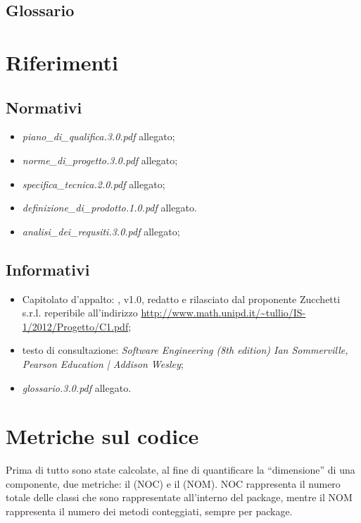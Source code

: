 \subsection{Glossario}
\glossaryIntro
\clearpage

\section{Riferimenti}
\subsection{Normativi}
\begin{itemize}
\item[] \textit{piano\_di\_qualifica.3.0.pdf} allegato;
\item[] \textit{norme\_di\_progetto.3.0.pdf} allegato;
\item[] \textit{specifica\_tecnica.2.0.pdf} allegato;
\item[] \textit{definizione\_di\_prodotto.1.0.pdf} allegato.
\item[] \textit{analisi\_dei\_requsiti.3.0.pdf} allegato;
\end{itemize}

\subsection{Informativi}
\begin{itemize}
\item[] Capitolato d'appalto: \caName{}, v1.0, redatto e rilasciato dal proponente Zucchetti s.r.l. reperibile all'indirizzo \url{http://www.math.unipd.it/~tullio/IS-1/2012/Progetto/C1.pdf};
\item[] testo di consultazione: \textit{Software Engineering (8th edition) Ian Sommerville, Pearson Education | Addison Wesley};
\item[] \textit{glossario.3.0.pdf} allegato.
\end{itemize}
\clearpage

\section{Metriche sul codice}
Prima di tutto sono state calcolate, al fine di quantificare la ``dimensione'' di una componente, due metriche: il  (NOC) e il  (NOM).
NOC rappresenta il numero totale delle classi che sono rappresentate all'interno del package, mentre il NOM rappresenta il numero dei metodi conteggiati, sempre per package.

